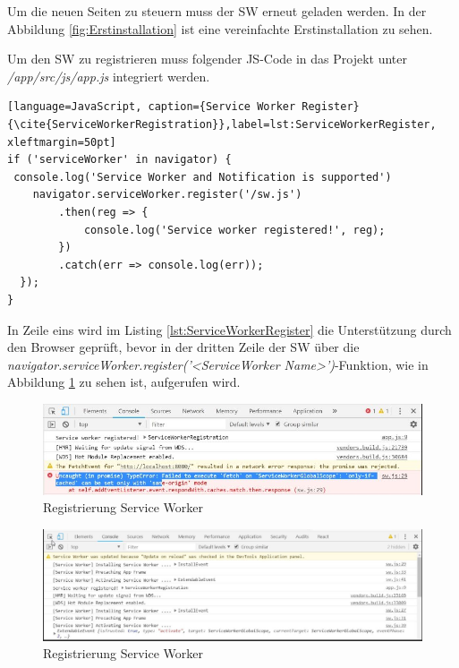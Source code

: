 Um die neuen Seiten zu steuern muss der \acs{SW} erneut geladen werden.
In der Abbildung \ref{fig:Erstinstallation} ist eine vereinfachte Erstinstallation zu sehen.


Um den \acs{SW} zu registrieren muss folgender \acs{JS}-Code in das Projekt unter \\ \textit{/app/src/js/app.js} integriert werden.
\begin{lstlisting}[language=JavaScript, caption={Service Worker Register} {\cite{ServiceWorkerRegistration}},label=lst:ServiceWorkerRegister, xleftmargin=50pt]
if ('serviceWorker' in navigator) {
 console.log('Service Worker and Notification is supported')
    navigator.serviceWorker.register('/sw.js')
        .then(reg => {
            console.log('Service worker registered!', reg);
        })
        .catch(err => console.log(err));
  });
}
\end{lstlisting}

In Zeile eins wird im Listing \ref{lst:ServiceWorkerRegister} die Unterstützung durch den Browser geprüft, bevor in der dritten Zeile der \acs{SW} über die\\ \textit{navigator.serviceWorker.register('<ServiceWorker Name>')}-Funktion, wie in Abbildung \ref{fig:RegistrierungSW} zu sehen ist, aufgerufen wird.
\begin{figure}[h]
	\centering
	\includegraphics[width=15cm]{BilderAllgemein/SW_Registred}\medskip
	\caption{Registrierung Service Worker}
	\label{fig:RegistrierungSW}
\end{figure}

\begin{figure}[h]
	\centering
	\includegraphics[width=15cm]{BilderAllgemein/SW_Activated}\medskip
	\caption{Registrierung Service Worker}
	\label{fig:Aktivierung}
\end{figure}


